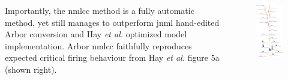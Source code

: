 \documentclass{beamer}
\begin{document}
\begin{frame}[t, fragile]
\begin{columns}
\begin{column}{0.42\textwidth}
        Importantly, the nmlcc method is a fully automatic method,
        yet still manages to outperform jnml hand-edited Arbor conversion
        and Hay \emph{et al.} optimized model implementation.
        Arbor nmlcc faithfully reproduces expected critical firing behaviour from Hay \emph{et al.} figure 5a (shown right).
    \end{column}
    \begin{column}{0.15\textwidth}
      \begin{figure}[h]
        \centering
        \includegraphics[width=\textwidth]{./benchmark/5a_cropped.pdf}

\end{figure}
\end{column}
\end{columns}
\end{frame}
\end{document}
